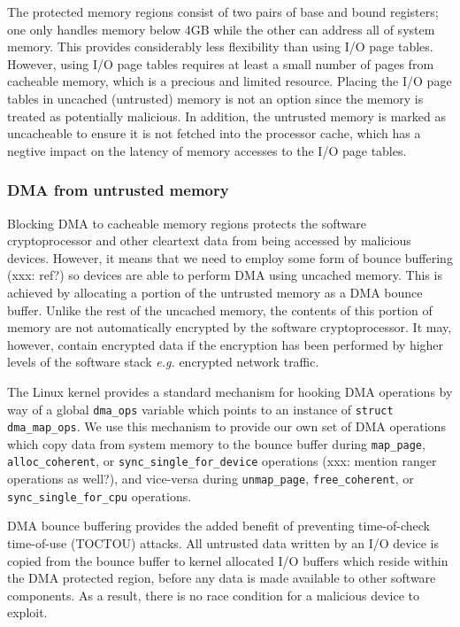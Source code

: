 The protected memory regions consist of two pairs of base and bound registers; one only handles memory below 4GB while the other can address all of system memory. This provides considerably less flexibility than using I/O page tables. However, using I/O page tables requires at least a small number of pages from cacheable memory, which is a precious and limited resource. Placing the I/O page tables in uncached (untrusted) memory is not an option since the memory is treated as potentially malicious. In addition, the untrusted memory is marked as uncacheable to ensure it is not fetched into the processor cache, which has a negtive impact on the latency of memory accesses to the I/O page tables.

\subsubsection{DMA from untrusted memory}
\label{sec:dma-bounce}
Blocking DMA to cacheable memory regions protects the software cryptoprocessor and other cleartext data from being accessed by malicious devices. However, it means that we need to employ some form of bounce buffering (xxx: ref?) so devices are able to perform DMA using uncached memory. This is achieved by allocating a portion of the untrusted memory as a DMA bounce buffer. Unlike the rest of the uncached memory, the contents of this portion of memory are not automatically encrypted by the software cryptoprocessor. It may, however, contain encrypted data if the encryption has been performed by higher levels of the software stack \emph{e.g.} encrypted network traffic.

The Linux kernel provides a standard mechanism for hooking DMA operations by way of a global {\tt dma\_ops} variable which points to an instance of {\tt struct dma\_map\_ops}. We use this mechanism to provide our own set of DMA operations which copy data from system memory to the bounce buffer during {\tt map\_page}, {\tt alloc\_coherent}, or {\tt sync\_single\_for\_device} operations (xxx: mention ranger operations as well?), and vice-versa during {\tt unmap\_page}, {\tt free\_coherent}, or {\tt sync\_single\_for\_cpu} operations.

DMA bounce buffering provides the added benefit of preventing time-of-check time-of-use (TOCTOU) attacks. All untrusted data written by an I/O device is copied from the bounce buffer to kernel allocated I/O buffers which reside within the DMA protected region, before any data is made available to other software components. As a result, there is no race condition for a malicious device to exploit.

